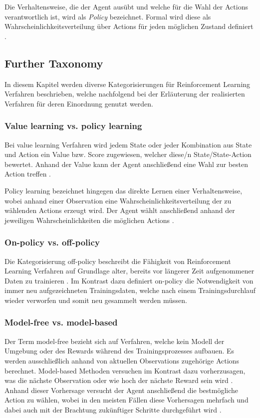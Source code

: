\documentclass[11pt]{scrartcl}
\begin{document}
Die Verhaltensweise, die der Agent ausübt und welche für die Wahl der Actions verantwortlich ist,
wird als \textit{Policy} bezeichnet. Formal wird diese als Wahrscheinlichkeitsverteilung
über Actions für jeden möglichen Zustand definiert \cite[~S.22 f.]{L2018}. 

\subsection{Further Taxonomy} %
In diesem Kapitel werden diverse Kategorisierungen für Reinforcement Learning Verfahren beschrieben,
welche nachfolgend bei der Erläuterung der realisierten Verfahren für deren Einordnung genutzt werden.  


\subsubsection{Value learning vs. policy learning}
Bei value learning Verfahren wird jedem State oder jeder Kombination aus State und Action ein Value bzw.
Score zugewiesen, welcher diese/n State/State-Action bewertet. Anhand der Value kann der Agent 
anschließend eine Wahl zur besten Action treffen \cite[~S.NA]{L2018}.

Policy learning bezeichnet hingegen das direkte Lernen einer Verhaltensweise, wobei anhand einer 
Observation eine Wahrscheinlichkeitsverteilung der zu wählenden Actions erzeugt wird. Der Agent wählt
anschließend anhand der jeweiligen Wahrscheinlichkeiten die möglichen Actions \cite[~S.NA]{L2018}.


\subsubsection{On-policy vs. off-policy}
Die Kategorisierung off-policy beschreibt die Fähigkeit von Reinforcement Learning Verfahren auf
Grundlage alter, bereits vor längerer Zeit aufgenommener Daten zu trainieren \cite[~S.NA]{L2018}. 
Im Kontrast dazu definiert on-policy die Notwendigkeit von immer neu aufgezeichneten 
Trainingsdaten, welche nach einem Trainingsdurchlauf wieder verworfen und somit neu gesammelt
werden müssen.


\subsubsection{Model-free vs. model-based}
Der Term model-free bezieht sich auf Verfahren, welche kein Modell der Umgebung oder des Rewards
während des Trainingsprozesses aufbauen. Es werden ausschließlich anhand von aktuellen Observations
zugehörige Actions berechnet. Model-based Methoden versuchen im Kontrast dazu vorherzusagen, was 
die nächste Observation oder wie hoch der nächste Reward sein wird \cite[~S.NA]{L2018}. Anhand dieser
Vorhersage versucht der Agent anschließend die bestmögliche Action zu wählen, wobei in den meisten
Fällen diese Vorhersagen mehrfach und dabei auch mit der Brachtung zukünftiger Schritte durchgeführt
wird \cite[~S.NA]{L2018}.
\end{document}
